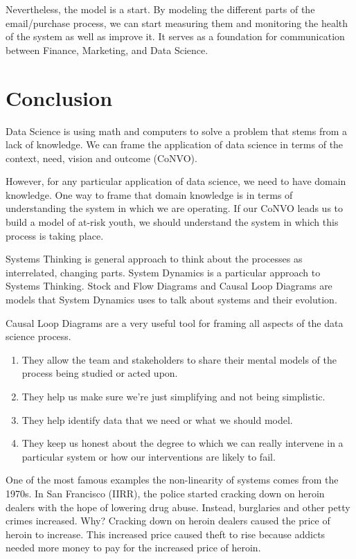 \documentclass[letterpaper,10pt,english]{sphinxmanual}
\begin{document}
Nevertheless, the model is a start. By modeling the different parts of the email/purchase process, we can start measuring them and monitoring the health of the system as well as improve it. It serves as a foundation for communication between Finance, Marketing, and Data Science.


\section{Conclusion}
\label{\detokenize{index:Conclusion}}
Data Science is using math and computers to solve a problem that stems from a lack of knowledge. We can frame the application of data science in terms of the context, need, vision and outcome (CoNVO).

However, for any particular application of data science, we need to have domain knowledge. One way to frame that domain knowledge is in terms of understanding the system in which we are operating. If our CoNVO leads us to build a model of at-risk youth, we should understand the system in which this process is taking place.

Systems Thinking is general approach to think about the processes as interrelated, changing parts. System Dynamics is a particular approach to Systems Thinking. Stock and Flow Diagrams and Causal Loop Diagrams are models that System Dynamics uses to talk about systems and their evolution.

Causal Loop Diagrams are a very useful tool for framing all aspects of the data science process.
\begin{enumerate}
\def\theenumi{\arabic{enumi}}
\def\labelenumi{\theenumi .}
\makeatletter\def\p@enumii{\p@enumi \theenumi .}\makeatother
\item {} 
They allow the team and stakeholders to share their mental models of the process being studied or acted upon.

\item {} 
They help us make sure we’re just simplifying and not being simplistic.

\item {} 
They help identify data that we need or what we should model.

\item {} 
They keep us honest about the degree to which we can really intervene in a particular system or how our interventions are likely to fail.

\end{enumerate}

One of the most famous examples the non-linearity of systems comes from the 1970s. In San Francisco (IIRR), the police started cracking down on heroin dealers with the hope of lowering drug abuse. Instead, burglaries and other petty crimes increased. Why? Cracking down on heroin dealers caused the price of heroin to increase. This increased price caused theft to rise because addicts needed more money to pay for the increased price of heroin.
\end{document}
